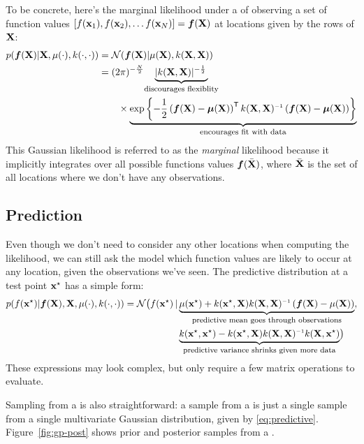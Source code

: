 To be concrete, here's the marginal likelihood under a \gp{} of observing a set of function values $\left[ f({\bf{x}}_1), f({\bf{x}}_2), \ldots f({\bf{x}}_N)  \right] = \boldsymbol{f}(\mathbf{X})$ at locations given by the rows of $\mathbf{X}$:
%
\begin{align}
p(\funcval | \vX, \mu(\cdot), k(\cdot, \cdot)) & = \N{\funcval}{\mu(\vX)}{k(\vX, \vX)} \nonumber\\
& = (2\pi)^{-\frac{N}{2}} \underwrite{ |k(\vX, \vX)|^{-\frac{1}{2}}\,}{\footnotesize discourages flexiblity} \nonumber \\
& \qquad \times \underwrite{\exp \left\{ -\frac{1}{2} \left( \funcval - \boldsymbol\mu(\vX) \right)\tra k(\vX, \vX)\inv \left(\funcval - \boldsymbol\mu(\vX) \right) \right\}}{\footnotesize encourages fit with data}
\label{eq:gp_marg_lik}
\end{align}
%
This Gaussian likelihood is referred to as the \emph{marginal} likelihood because it implicitly integrates over all possible functions values $\boldsymbol{f}( \bar {\mathbf{X}})$, where $\bar {\mathbf{X}}$ is the set of all locations where we don't have any observations.

\subsection{Prediction}
Even though we don't need to consider any other locations when computing the likelihood, we can still ask the model which function values are likely to occur at any location, given the observations we've seen.
The predictive distribution at a test point ${{\bf{x}}^\star}$ has a simple form:
%
\begin{align}
p( f(\testpoint) | \funcval, \vX, \mu(\cdot), k(\cdot, \cdot))
 = \mathcal{N} \big( f(\testpoint) \given & \underwrite{\mu(\testpoint) + k(\testpoint, \vX) k(\vX, \vX)\inv \left( \funcval - \mu(\vX) \right) }{\footnotesize predictive mean goes through observations}, \nonumber \\
 & \underwrite{k(\testpoint, \testpoint) - k(\testpoint, \vX) k(\vX, \vX)\inv k(\vX, \testpoint)}{\footnotesize predictive variance shrinks given more data}
 \big)
\label{eq:predictive}
\end{align}
%
These expressions may look complex, but only require a few matrix operations to evaluate.


Sampling from a \gp{} is also straightforward: a sample from a \gp{} is just a single sample from a single multivariate Gaussian distribution, given by \cref{eq:predictive}.
Figure~\ref{fig:gp-post} shows prior and posterior samples from a \gp{}.

